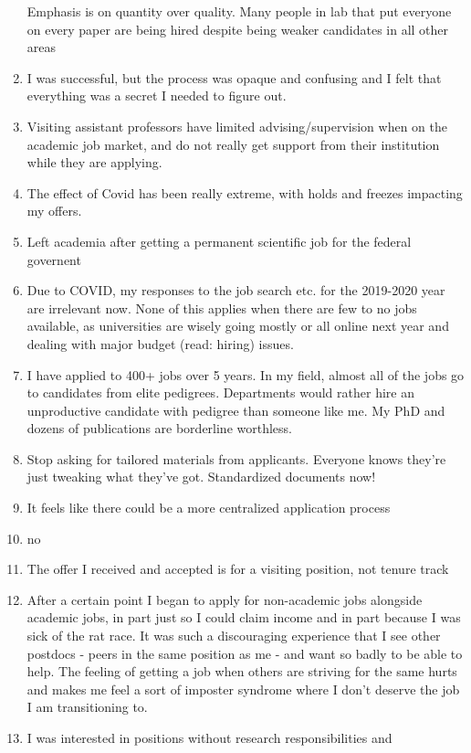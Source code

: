 \documentclass[]{article}
\begin{document}
\begin{enumerate}
  Emphasis is on quantity over quality. Many people in lab that put
  everyone on every paper are being hired despite being weaker
  candidates in all other areas
\item
  I was successful, but the process was opaque and confusing and I felt
  that everything was a secret I needed to figure out.
\item
  Visiting assistant professors have limited advising/supervision when
  on the academic job market, and do not really get support from their
  institution while they are applying.
\item
  The effect of Covid has been really extreme, with holds and freezes
  impacting my offers.
\item
  Left academia after getting a permanent scientific job for the federal
  governent
\item
  Due to COVID, my responses to the job search etc. for the 2019-2020
  year are irrelevant now. None of this applies when there are few to no
  jobs available, as universities are wisely going mostly or all online
  next year and dealing with major budget (read: hiring) issues.
\item
  I have applied to 400+ jobs over 5 years. In my field, almost all of
  the jobs go to candidates from elite pedigrees. Departments would
  rather hire an unproductive candidate with pedigree than someone like
  me. My PhD and dozens of publications are borderline worthless.
\item
  Stop asking for tailored materials from applicants. Everyone knows
  they're just tweaking what they've got. Standardized documents now!
\item
  It feels like there could be a more centralized application process
\item
  no
\item
  The offer I received and accepted is for a visiting position, not
  tenure track
\item
  After a certain point I began to apply for non-academic jobs alongside
  academic jobs, in part just so I could claim income and in part
  because I was sick of the rat race. It was such a discouraging
  experience that I see other postdocs - peers in the same position as
  me - and want so badly to be able to help. The feeling of getting a
  job when others are striving for the same hurts and makes me feel a
  sort of imposter syndrome where I don't deserve the job I am
  transitioning to.
\item
  I was interested in positions without research responsibilities and

\end{enumerate}
\end{document}
